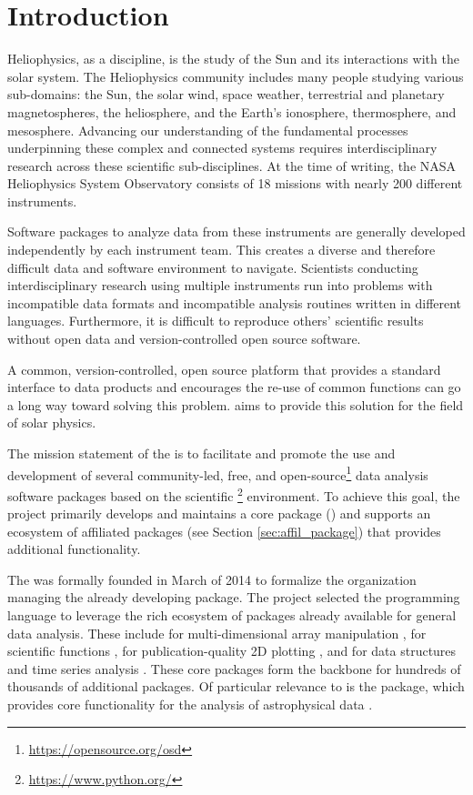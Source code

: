 \section{Introduction}
\label{sec:intro}

Heliophysics, as a discipline, is the study of the Sun and its interactions with the solar system.
The Heliophysics community includes many people studying various sub-domains: the Sun, the solar wind, space weather, terrestrial and planetary magnetospheres, the heliosphere, and the Earth's ionosphere, thermosphere, and mesosphere.
Advancing our understanding of the fundamental processes underpinning these complex and connected systems requires interdisciplinary research across these scientific sub-disciplines.
At the time of writing, the NASA Heliophysics System Observatory consists of 18 missions with nearly 200 different instruments.

Software packages to analyze data from these instruments are generally developed independently by each instrument team.
This creates a diverse and therefore difficult data and software environment to navigate.
Scientists conducting interdisciplinary research using multiple instruments run into problems with incompatible data formats and incompatible analysis routines written in different languages.
Furthermore, it is difficult to reproduce others' scientific results without open data and version-controlled open source software.

A common, version-controlled, open source platform that provides a standard interface to data products and encourages the re-use of common functions can go a long way toward solving this problem.
\sunpy aims to provide this solution for the field of solar physics.

The mission statement of the \sunpyproj is to facilitate and promote the use and development of several community-led, free, and open-source\footnote{\url{https://opensource.org/osd}} data analysis software packages based on the scientific \python\footnote{\url{https://www.python.org/}} environment.
To achieve this goal, the project primarily develops and maintains a core package (\sunpypkg) and supports an ecosystem of affiliated packages (see Section \ref{sec:affil_package}) that provides additional functionality.

The \sunpyproj was formally founded in March of 2014 to formalize the organization managing the already developing \sunpypkg package.
The project selected the \python programming language to leverage the rich ecosystem of packages already available for general data analysis.
These include  for multi-dimensional array manipulation \citep{numpy},  for scientific functions \citep{scipy},  for publication-quality 2D plotting \citep{matplotlib}, and  for data structures and time series analysis \citep{pandas}.
These core packages form the backbone for hundreds of thousands of additional \python packages.
Of particular relevance to \sunpypkg is the \astropypkg package, which provides core functionality for the analysis of astrophysical data \citep{astropy2018}.

